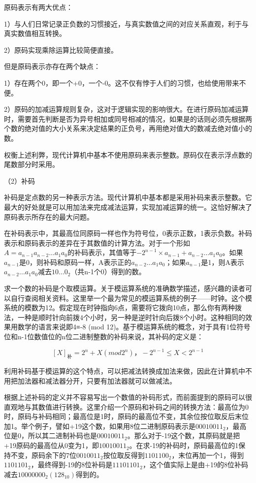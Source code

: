 \documentclass[]{ctexbook}
\begin{document}
原码表示有两大优点：

1）与人们日常记录正负数的习惯接近，与真实数值之间的对应关系直观，利于与真实数值相互转换。

2）原码实现乘除运算比较简便直接。

但是原码表示亦存在两个缺点：

1）存在两个0，即一个+0，一个-0。这不仅有悖于人们的习惯，也给使用带来不便。

2）原码的加减运算规则复杂，这对于逻辑实现的影响很大。在进行原码加减运算时，需要首先判断是否为异号相加或同号相减的情况，如果是的话则必须先根据两个数的绝对值的大小关系来决定结果的正负号，再用绝对值大的数减去绝对值小的数。

权衡上述利弊，现代计算机中基本不使用原码来表示整数。原码仅在表示浮点数的尾数部分时采用。

（2）补码

补码是定点数的另一种表示方法。现代计算机中基本都是采用补码来表示整数。它最大的好处就是可以用加法来完成减法运算，实现加减运算的统一。这恰好解决了原码表示所存在的最大问题。

在补码表示中，其最高位同原码一样也作为符号位，0表示正数，1表示负数。补码表示和原码表示的差异在于其数值的计算方法。对于一个形如\(A=a_{n-1}a_{n-2}\ldots a_{1}a_{0}\)的补码表示，其值等于\(-2^{n-1}\times a_{n-1}+a_{n-2}\ldots a_{1}a_{0}\)。如果\(a_{n-1}\)是0，则补码和原码一样，A表示正的\(a_{n-2}\ldots a_{1}a_{0}\)；如果\(a_{n-1}\)是1，则A表示\(a_{n-2}\ldots a_{1}a_{0}\)减去\(10\ldots 0_{2}\)（共n-1个0）得到的数。

求一个数的补码是个取模运算。关于模运算系统的准确数学描述，感兴趣的读者可以自行查阅相关资料。这里举一个最为常见的模运算系统的例子------时钟。这个模系统的模数为12。假定现在时钟指向6点，需要将它拨向10点，那么你有两种拨法，一种是顺时针向前拨4个小时，另一种是逆时针向后拨8个小时。这种相同的效果用数学的语言来说即4≡-8 (mod 12)。基于模运算系统的概念，对于具有1位符号位和n-1位数值位的n位二进制整数的补码来说，其补码的定义是：

\[[X]_{\mbox{补}}=2^{n}+X (mod 2^{n})，-2^{n-1}≤X<2^{n-1}\]

利用补码基于模运算的这个特点，可以把减法转换成加法来做，因此在计算机中不用把加法器和减法器分开，只要有加法器就可以做减法。

根据上述补码的定义并不容易写出一个数值的补码形式，而前面提到的原码可以很直观地与其数值进行转换。这里介绍一个原码和补码之间的转换方法：最高位为0时，原码与补码相同；最高位是1时，原码的最高位不变，其余位按位取反后末位加1。举个例子，譬如+19这个数，如果用8位二进制原码表示是\(00010011_{2}\)，最高位是0，所以其二进制补码也是\(00010011_{2}\)。那么对于-19这个数，其原码就是把+19原码的最高位从0变为1，即\(10010011_{2}\)。在求-19的补码时，原码最高位的1保持不变，原码余下的7位\(0010011_{2}\)按位取反得到\(1101100_{2}\)，末位再加一个1，得到\(1101101_{2}\)，最终得到-19的8位补码是\(11101101_{2}\)，这个值实际上是由+19的8位补码减去\(10000000_{2}(128_{10})\)得到的。
\end{document}
